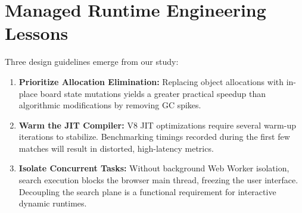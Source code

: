 \section{Managed Runtime Engineering Lessons}
Three design guidelines emerge from our study:
\begin{enumerate}
    \item \textbf{Prioritize Allocation Elimination:} Replacing object allocations with in-place board state mutations yields a greater practical speedup than algorithmic modifications by removing GC spikes.
    \item \textbf{Warm the JIT Compiler:} V8 JIT optimizations require several warm-up iterations to stabilize. Benchmarking timings recorded during the first few matches will result in distorted, high-latency metrics.
    \item \textbf{Isolate Concurrent Tasks:} Without background Web Worker isolation, search execution blocks the browser main thread, freezing the user interface. Decoupling the search plane is a functional requirement for interactive dynamic runtimes.
\end{enumerate}
